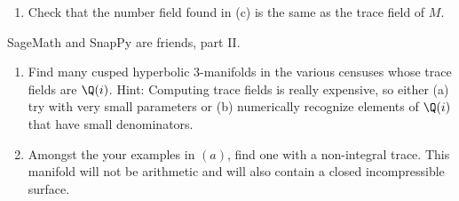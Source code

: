 \documentclass[tikz, a4paper]{nmd/hw}
\begin{document}
\begin{problems}
\begin{enumerate}
  \item Check that the number field found in (c) is the same as the
    trace field of $M$.  
  \end{enumerate}

\item SageMath and SnapPy are friends, part II.
  \begin{enumerate}
    \item Find many cusped hyperbolic 3-manifolds in the various
      censuses whose trace fields are $\Q(i)$.  Hint: Computing trace
      fields is really expensive, so either (a) try with very small
      parameters or (b) numerically recognize elements of $\Q(i)$ that
      have small denominators.

    \item Amongst the your examples in $(a)$, find one with a 
      non-integral trace.  This manifold will not be arithmetic and
      will also contain a closed incompressible surface.  
  \end{enumerate}

\end{problems}
\end{document}
